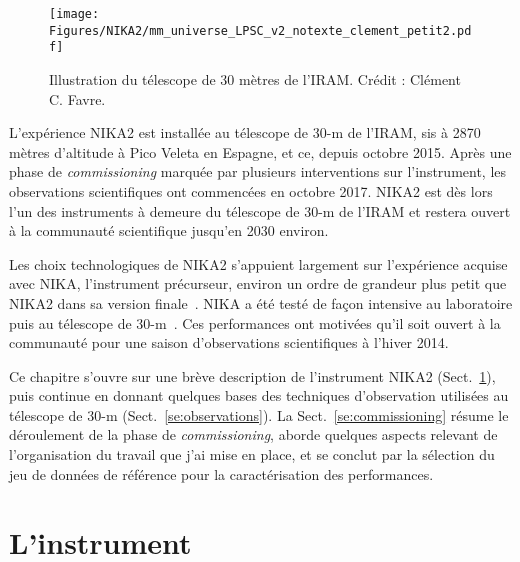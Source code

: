 
\begin{figure}[ht!] 
\begin{center}
\texttt{[image: Figures/NIKA2/mm\_universe\_LPSC\_v2\_notexte\_clement\_petit2.pdf]}
\caption[Illustration du télescope de 30 mètres de
  l'IRAM]{Illustration du télescope de 30 mètres de l'IRAM. Crédit :
  Clément C. Favre.} 
 \label{fig:affiche}
\end{center}
\end{figure}


L'expérience NIKA2 est installée au télescope de 30-m de l'IRAM, sis à 
2870 mètres d'altitude à Pico Veleta en Espagne, et ce, depuis
octobre 2015. Après une phase de \emph{commissioning} marquée par
plusieurs interventions sur l'instrument, les observations
scientifiques ont commencées en octobre 2017. NIKA2 est dès lors l'un
des instruments à demeure du télescope de 30-m de l'IRAM et restera
ouvert à la communauté scientifique jusqu'en 2030 environ.

Les choix technologiques de NIKA2 s'appuient largement sur
l'expérience acquise avec NIKA, l'instrument précurseur, environ un
ordre de grandeur plus petit que NIKA2 dans sa version
finale~\citep{Monfardini2014JLTP}. NIKA a été testé de façon intensive
au laboratoire puis au télescope de 30-m~\citep{Catalano2014}. Ces
performances ont motivées qu'il soit ouvert à la communauté pour une
saison d'observations scientifiques à l'hiver 2014.

Ce chapitre s'ouvre sur une brève description de l'instrument NIKA2
(Sect.~\ref{se:instrument}), puis continue en donnant quelques bases
des techniques d'observation utilisées au télescope de 30-m
(Sect.~\ref{se:observations}). La Sect.~\ref{se:commissioning} résume
le déroulement de la phase de \emph{commissioning}, aborde quelques
aspects relevant de l'organisation du travail que j'ai mise en place,
et se conclut par la sélection du jeu de données de référence pour la
caractérisation des performances.



\section{L'instrument}
\label{se:instrument}

